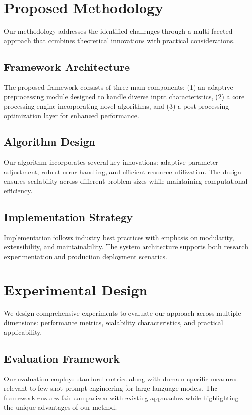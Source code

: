 \documentclass[11pt,twocolumn]{article}
\begin{document}
\section{Proposed Methodology}
Our methodology addresses the identified challenges through a multi-faceted approach that combines theoretical innovations with practical considerations.

\subsection{Framework Architecture}
The proposed framework consists of three main components: (1) an adaptive preprocessing module designed to handle diverse input characteristics, (2) a core processing engine incorporating novel algorithms, and (3) a post-processing optimization layer for enhanced performance.

\subsection{Algorithm Design}
Our algorithm incorporates several key innovations: adaptive parameter adjustment, robust error handling, and efficient resource utilization. The design ensures scalability across different problem sizes while maintaining computational efficiency.

\subsection{Implementation Strategy}
Implementation follows industry best practices with emphasis on modularity, extensibility, and maintainability. The system architecture supports both research experimentation and production deployment scenarios.

\section{Experimental Design}
We design comprehensive experiments to evaluate our approach across multiple dimensions: performance metrics, scalability characteristics, and practical applicability.

\subsection{Evaluation Framework}
Our evaluation employs standard metrics along with domain-specific measures relevant to few-shot prompt engineering for large language models. The framework ensures fair comparison with existing approaches while highlighting the unique advantages of our method.
\end{document}
